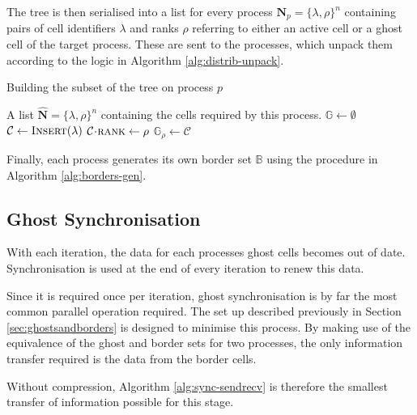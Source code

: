 \documentclass{IIBproject}
\newcommand{\vect} [1] {\bm{#1}}
\newcommand{\acc}{{\mkern 0.5mu\cdot\mkern 0.5mu}}
\numberwithin{figure}{section}
\begin{document}
The tree is then serialised into a list for every process $\vect{N}_p=\{\lambda,\rho\}^n$ containing pairs of cell identifiers $\lambda$ and ranks $\rho$ referring to either an active cell or a ghost cell of the target process. These are sent to the processes, which unpack them according to the logic in Algorithm \ref{alg:distrib-unpack}.

\begin{algorithm}[H]
    \caption{Building the subset of the tree on process $p$}
    \label{alg:distrib-unpack}

    \begin{algorithmic}
        \Require A list $\vect{\hat N}=\{\lambda,\rho\}^n$ containing the cells required by this process.
        \Statex
        \State $\mathbb{G} \gets \emptyset$ 
        \ForEach {packed cell $\{\lambda,\rho\} \in \vect{\hat N}$}
            \State $\mathcal{C} \gets \textproc{Insert}(\lambda)$ 
            \State $\mathcal{C}\acc\textproc{rank} \gets \rho$
             
                \State $\mathbb{G}_\rho \gets \mathcal{C}$
            \EndIf
        \EndFor
    \end{algorithmic}
\end{algorithm}

Finally, each process generates its own border set $\mathbb{B}$ using the procedure in Algorithm \ref{alg:borders-gen}.


\subsection{Ghost Synchronisation}

With each iteration, the data for each processes ghost cells becomes out of date. Synchronisation is used at the end of every iteration to renew this data.

Since it is required once per iteration, ghost synchronisation is by far the most common parallel operation required. The set up described previously in Section \ref{sec:ghostsandborders} is designed to minimise this process. By making use of the equivalence of the ghost and border sets for two processes, the only information transfer required is the data from the border cells.

Without compression, Algorithm \ref{alg:sync-sendrecv} is therefore the smallest transfer of information possible for this stage.
\end{document}
